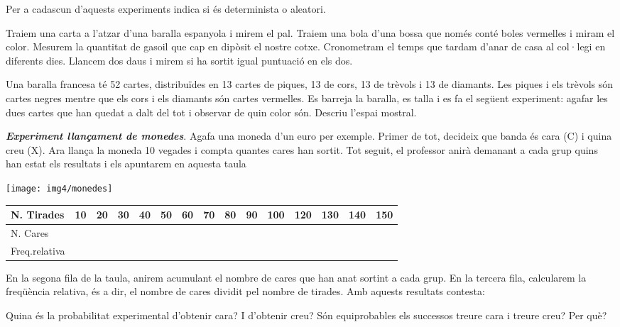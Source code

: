 \begin{mylist}
\exer \mental Per a cadascun d'aquests experiments indica si és determinista o aleatori.
\begin{tasks} 
	\task  Traiem una carta a l'atzar d'una baralla espanyola i mirem el pal.
	\task  Traiem una bola d'una bossa que només conté boles vermelles i miram el color.
	\task  Mesurem la quantitat de gasoil que cap en dipòsit el nostre cotxe.
	\task  Cronometram el temps que tardam d'anar de casa al col·legi en diferents dies.
	\task  Llancem dos daus i mirem si ha sortit igual puntuació en els dos.
\end{tasks}

\exer  Una baralla francesa té 52 cartes, distribuïdes en 13 cartes de piques, 13 de cors, 13 de trèvols i 13 de diamants. Les piques i els trèvols són cartes negres mentre que els cors i els diamants són cartes vermelles. Es barreja la baralla, es talla i es fa el següent experiment: agafar les dues cartes que han quedat a dalt del tot i observar de quin color són. Descriu l'espai mostral. 
  
\vspace{-2cm}
\exer \simbolsearch \begin{minipage}[t]{0.7\textwidth} \textit{\bf Experiment llançament de monedes}. Agafa una moneda d'un euro per exemple. Primer de tot, decideix que banda és cara (C) i quina creu (X). Ara llança la moneda 10 vegades i compta quantes cares han sortit.  Tot seguit, el professor anirà demanant a cada grup quins han estat els resultats i els apuntarem en aquesta taula
	\end{minipage}
\begin{minipage}{0.3\textwidth}
	\vspace{2cm}
	\centering
	\texttt{[image: img4/monedes]}
\end{minipage}
	

\begin{longtable}{|p{0.7in}|p{0.2in}|p{0.2in}|p{0.2in}|p{0.2in}|p{0.2in}|p{0.2in}|p{0.2in}|p{0.2in}|p{0.2in}|p{0.2in}|p{0.2in}|p{0.2in}|p{0.2in}|p{0.2in}|} \hline 
N. Tirades & 10 & 20 & 30 & 40 & 50 & 60 & 70 & 80 & 90 & 100 & 120 & 130 & 140 & 150 \\ \hline 
N. Cares &  &  &  &  &  &  &  &  &  &  &  &  &  &  \\ \hline 
Freq.\newline relativa &  &  &  &  &  &  &  &  &  &  &  &  &  &  \\ \hline 
\end{longtable}
  En la segona fila de la taula, anirem acumulant el nombre de cares que han anat sortint a cada grup. En la tercera fila, calcularem la freqüència relativa, és a dir, el nombre de cares dividit pel nombre de tirades. Amb aquests resultats contesta:
\begin{tasks} 
\task Quina és la probabilitat experimental d'obtenir cara? I d'obtenir creu?
\task Són equiprobables els successos treure cara i treure creu? Per què?
\end{tasks}


\end{mylist}
